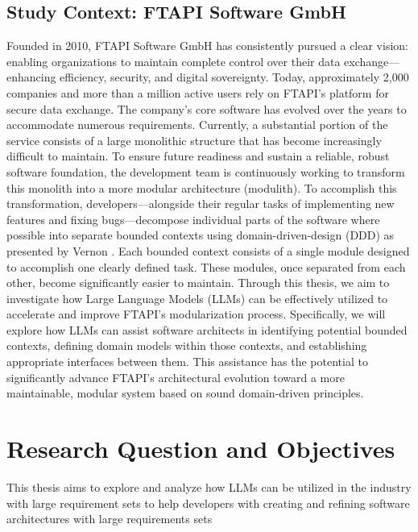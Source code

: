 \documentclass[12pt,a4paper]{article}
\begin{document}
\subsection{Study Context: FTAPI Software GmbH}
Founded in 2010, FTAPI Software GmbH has consistently pursued a clear vision: enabling organizations to maintain complete control over their data exchange—enhancing efficiency, security, and digital sovereignty. Today, approximately 2,000 companies and more than a million active users rely on FTAPI's platform for secure data exchange.
The company's core software has evolved over the years to accommodate numerous requirements. Currently, a substantial portion of the service consists of a large monolithic structure that has become increasingly difficult to maintain. To ensure future readiness and sustain a reliable, robust software foundation, the development team is continuously working to transform this monolith into a more modular architecture (modulith).
To accomplish this transformation, developers—alongside their regular tasks of implementing new features and fixing bugs—decompose individual parts of the software where possible into separate bounded contexts using domain-driven-design (DDD) as presented by Vernon \autocite[p.62]{vernon2013implementing}. Each bounded context consists of a single module designed to accomplish one clearly defined task. These modules, once separated from each other, become significantly easier to maintain.
Through this thesis, we aim to investigate how Large Language Models (LLMs) can be effectively utilized to accelerate and improve FTAPI's modularization process. Specifically, we will explore how LLMs can assist software architects in identifying potential bounded contexts, defining domain models within those contexts, and establishing appropriate interfaces between them. This assistance has the potential to significantly advance FTAPI's architectural evolution toward a more maintainable, modular system based on sound domain-driven principles.

\section{Research Question and Objectives}

This thesis aims to explore and analyze how LLMs can be utilized in the industry with large requirement sets to help developers with creating and refining software architectures with large requirements sets
\end{document}
